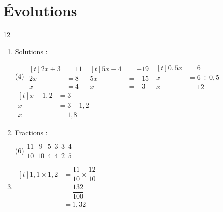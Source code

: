 \documentclass[10pt,a4paper]{article}
\begin{document}
\section{Évolutions}

\begin{corr}{12}
\begin{enumerate}[leftmargin=*]
    \item Solutions :
    \begin{tasks}[after-item-skip=0.3cm](4)
        \task \(\begin{aligned}[t] 2x+3&=11\\ 2x&=8\\ x&=4\end{aligned}\)
        \task \(\begin{aligned}[t] 5x-4&=-19\\ 5x&=-15\\ x&=-3\end{aligned}\)
        \task \(\begin{aligned}[t] 0,5x&=6\\ x&=6\div 0,5\\ x&=12\end{aligned}\)
        \task \(\begin{aligned}[t] x+1,2&=3\\ x&=3-1,2\\ x&=1,8\end{aligned}\)
    \end{tasks}
    \item Fractions :
    \begin{tasks}(6)
        \task \(\dfrac{11}{10}\)
        \task \(\dfrac{9}{10}\)
        \task \(\dfrac{5}{4}\)
        \task \(\dfrac{3}{4}\)
        \task \(\dfrac{3}{2}\)
        \task \(\dfrac{4}{5}\)
    \end{tasks}
    \item \(\begin{aligned}[t] 1,1\times 1,2&=\dfrac{11}{10}\times\dfrac{12}{10}\\ &=\dfrac{132}{100}\\ &=1,32\end{aligned}\)
\end{enumerate}
\end{corr}
\end{document}
